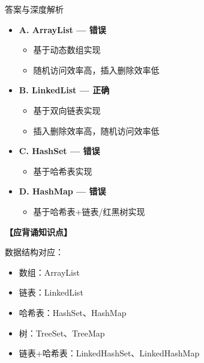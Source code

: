 \documentclass[12pt, a4paper]{ctexart}
\begin{document}
\begin{enumerate}[label=\textbf{\arabic*.}]
\begin{bluebox}{答案与深度解析}
\begin{itemize}[label={}, leftmargin=*, nosep]
		      
		      \item \textbf{A. ArrayList — 错误}
					  \begin{itemize}[label={}, nosep]
		      
			      \item 基于动态数组实现
			      \item 随机访问效率高，插入删除效率低
		      

					  \end{itemize}
		      \item \textbf{B. LinkedList — 正确}
					  \begin{itemize}[label={}, nosep]
		      
			      \item 基于双向链表实现
			      \item 插入删除效率高，随机访问效率低
		      

					  \end{itemize}
		      \item \textbf{C. HashSet — 错误}
					  \begin{itemize}[label={}, nosep]
		      
			      \item 基于哈希表实现
		      

					  \end{itemize}
		      \item \textbf{D. HashMap — 错误}
					  \begin{itemize}[label={}, nosep]
		      
			      \item 基于哈希表+链表/红黑树实现
		      
		      

		      
					  \end{itemize}
					  \end{itemize}
\textbf{【应背诵知识点】}

		      数据结构对应：
		      \begin{itemize}[label={}, nosep]
			      \item 数组：ArrayList
			      \item 链表：LinkedList
			      \item 哈希表：HashSet、HashMap
			      \item 树：TreeSet、TreeMap
			      \item 链表+哈希表：LinkedHashSet、LinkedHashMap
		      \end{itemize}
	      \end{bluebox}


\end{enumerate}
\end{document}
